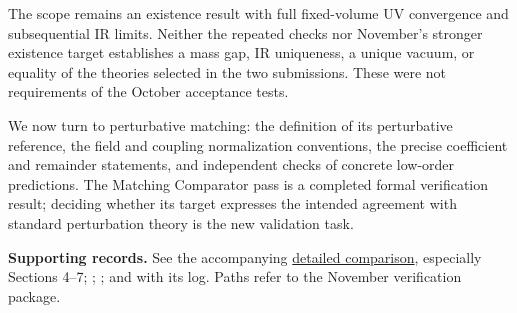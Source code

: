 \documentclass[11pt]{article}
\begin{document}
The scope remains an existence result with full fixed-volume UV convergence
and subsequential IR limits. Neither the repeated checks nor November's
stronger existence target establishes a mass gap, IR uniqueness, a unique
vacuum, or equality of the theories selected in the two submissions.
These were not requirements of the October acceptance tests.

We now turn to perturbative matching: the definition of its perturbative
reference, the field and coupling normalization conventions, the precise
coefficient and remainder statements, and independent checks of concrete
low-order predictions. The Matching Comparator pass is a completed formal
verification result; deciding whether its target expresses the intended
agreement with standard perturbation theory is the new validation task.

{\small\textbf{Supporting records.}
See the accompanying \href{october-november-existence-comparison.pdf}{detailed
comparison}, especially Sections 4--7; ;
; and
 with its log.
Paths refer to the November verification package.}
\end{document}
